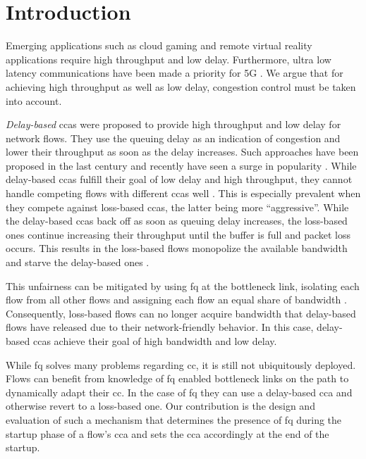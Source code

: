 \documentclass[runningheads]{llncs}
\begin{document}
\section{Introduction}
\label{sec:introduction}

Emerging applications such as cloud gaming \cite{jarschel_evaluation_2011} and remote virtual reality \cite{elbamby_toward_2018} applications require high throughput and low delay. Furthermore, ultra low latency communications have been made a priority for 5G \cite{li_5g_2018}. We argue that for achieving high throughput as well as low delay, congestion control must be taken into account. 

\textit{Delay-based} \glspl{cca} were proposed to provide high throughput and low delay for network flows. They use the queuing delay as an indication of congestion and lower their throughput as soon as the delay increases. Such approaches have been proposed in the last century \cite{brakmo_tcp_1995} and recently have seen a surge in popularity \cite{arun_copa_2018,hock_tcp_2017,mittal_timely_2015,cardwell_bbr:_2016}. While delay-based \glspl{cca} fulfill their goal of low delay and high throughput, they cannot handle competing flows with different \glspl{cca} well \cite{turkovic_fifty_2019, turkovic_interactions_2019}. This is especially prevalent when they compete against loss-based \glspl{cca}, the latter being more ``aggressive''. While the delay-based \glspl{cca} back off as soon as queuing delay increases, the loss-based ones continue increasing their throughput until the buffer is full and packet loss occurs. This results in the loss-based flows monopolize the available bandwidth and starve the delay-based ones \cite{hock_toward_2016,yuan-cheng_lai_improving_2001,awdeh_comparing_2004}.

This unfairness can be mitigated by using \gls{fq} at the bottleneck link, isolating each flow from all other flows and assigning each flow an equal share of bandwidth \cite{dumazet_pkt_sched:_2013}. Consequently, loss-based flows can no longer acquire bandwidth that delay-based flows have released due to their network-friendly behavior. In this case, delay-based \glspl{cca} achieve their goal of high bandwidth and low delay. 

While \gls{fq} solves many problems regarding \gls{cc}, it is still not ubiquitously deployed. Flows can benefit from knowledge of \gls{fq} enabled bottleneck links on the path to dynamically adapt their \gls{cc}. In the case of \gls{fq} they can use a delay-based \gls{cca} and otherwise revert to a loss-based one. Our contribution is the design and evaluation of such a mechanism that determines the presence of \gls{fq} during the startup phase of a flow's \gls{cca} and sets the \gls{cca} accordingly at the end of the startup. 
\end{document}

